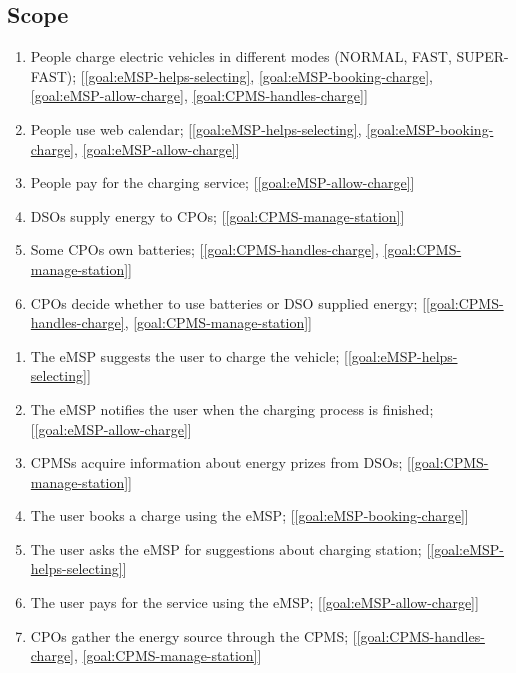 \subsection{Scope}

\begin{enumerate}[label=\textbf{W\arabic*}]
    \item People charge electric vehicles in different modes (NORMAL, FAST, SUPER-FAST); \label{world:people-charge-vehicles} [\ref{goal:eMSP-helps-selecting}, \ref{goal:eMSP-booking-charge}, \ref{goal:eMSP-allow-charge}, \ref{goal:CPMS-handles-charge}]
    \item People use web calendar; \label{world:people-use-calendars} [\ref{goal:eMSP-helps-selecting}, \ref{goal:eMSP-booking-charge}, \ref{goal:eMSP-allow-charge}]
    \item People pay for the charging service; \label{world:people-pay-service} [\ref{goal:eMSP-allow-charge}]
    \item \acp{DSO} supply energy to \acp{CPO}; \label{world:DSO-supply-energy} [\ref{goal:CPMS-manage-station}]
    \item Some \acp{CPO} own batteries; \label{world:CPO-own-batteries} [\ref{goal:CPMS-handles-charge}, \ref{goal:CPMS-manage-station}]
    \item \acp{CPO} decide whether to use batteries or \ac{DSO} supplied energy; \label{world:CPO-decide-energy} [\ref{goal:CPMS-handles-charge}, \ref{goal:CPMS-manage-station}]
\end{enumerate}
\begin{enumerate}[label=\textbf{S\arabic*}]
    \item The \ac{eMSP} suggests the user to charge the vehicle; \label{shared:eMSP-suggests-charge} [\ref{goal:eMSP-helps-selecting}]
    \item The \ac{eMSP} notifies the user when the charging process is finished; \label{shared:eMSP-notifies-charging-finished} [\ref{goal:eMSP-allow-charge}]
    \item \acp{CPMS} acquire information about energy prizes from \acp{DSO}; \label{shared:CPMS-info-from-DSO} [\ref{goal:CPMS-manage-station}]
    \item The user books a charge using the \ac{eMSP}; \label{shared:user-books-charge} [\ref{goal:eMSP-booking-charge}]
    \item The user asks the \ac{eMSP} for suggestions about charging station; \label{shared:user-asks-suggestions} [\ref{goal:eMSP-helps-selecting}]
    \item The user pays for the service using the \ac{eMSP}; \label{shared:user-pays-service} [\ref{goal:eMSP-allow-charge}]
    \item \acp{CPO} gather the energy source through the \ac{CPMS}; \label{shared:CPO-energy-through-CPMS} [\ref{goal:CPMS-handles-charge}, \ref{goal:CPMS-manage-station}]
\end{enumerate}

